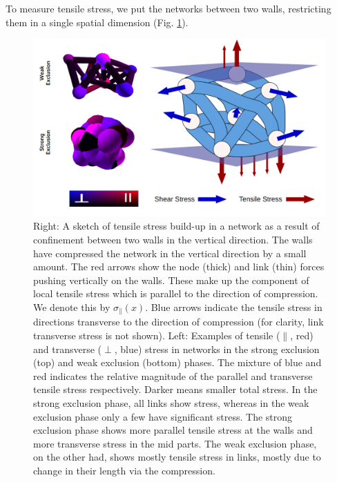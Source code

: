 \documentclass[nofootinbib,preprint,floatfix,endfloats]{revtex4} %
\begin{document}
To measure tensile stress, we put the networks between two walls, restricting them in a single spatial dimension (Fig. \ref{fig:stress}). 
\begin{figure}
    \centering
    \includegraphics[width = .7\columnwidth]{fig-09-19/stress-ex.png}
    \caption{Right: A sketch of tensile stress build-up in a network as a result of confinement between two walls in the vertical direction. 
    The walls have compressed the network in the vertical direction by a small amount. %
    The red arrows show the node (thick) and link (thin) forces pushing vertically on the walls.  
    These make up the component of local tensile stress which is parallel to the direction of compression. 
    We denote this by $\sigma_\parallel(x)$. 
    Blue arrows indicate the tensile stress in directions 
    transverse to the direction of compression (for clarity, link transverse stress is not shown).
    Left: Examples of tensile ($\parallel$, red) and transverse ($\perp$, blue) stress in networks in the strong exclusion (top) and weak exclusion (bottom) phases. 
    The mixture of blue and red indicates the relative magnitude of the parallel and transverse tensile stress respectively. Darker means smaller total stress. 
    In the strong exclusion phase, all links show stress, whereas in the weak exclusion phase only a few have significant stress. 
    The strong exclusion phase shows more parallel tensile stress at the walls and more transverse stress in the mid parts. 
    The weak exclusion phase, on the other had, shows mostly tensile stress in links, mostly due to change in their length via the compression.}
    \label{fig:stress}
\end{figure}
\end{document}
